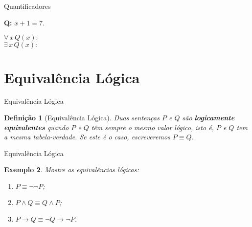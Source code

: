 \documentclass[10pt]{beamer}
\renewcommand{\indent}{\hspace*{2em}}
\theoremstyle{plain}
\newtheorem{defn}{Definição}[section]
\newtheorem{ex}[defn]{Exemplo}
\begin{document}
\begin{frame}{Quantificadores}
    \begin{block}{}
     \textbf{Q:} $x+1=7$.
    \end{block}
    $$$$
    $\forall\,x\,Q(x):$
    $$$$
    $$$$
    $\exists\,x\,Q(x):$
\end{frame}
\section{Equivalência Lógica}

\begin{frame}{Equivalência Lógica}
 \begin{defn}[Equivalência Lógica]
 \vfill\indent Duas sentenças $P$ e $Q$ são \textbf{logicamente equivalentes} quando $P$ e $Q$ têm sempre o mesmo valor lógico, isto é, $P$ e $Q$ tem a mesma tabela-verdade. Se este é o caso, escreveremos $P\equiv Q$.
 \end{defn}
\end{frame}

\begin{frame}{Equivalência Lógica}
 \begin{ex}
 \vfill\indent Mostre as equivalências lógicas:
 \begin{enumerate}[a-]
     \item $P\equiv\neg\neg P$;
     
     \item $P\wedge Q\equiv Q\wedge P$;
     
     \item $P\rightarrow Q\equiv\neg Q\rightarrow\neg P$.
 \end{enumerate}
 \end{ex}
\end{frame}

\end{document}
